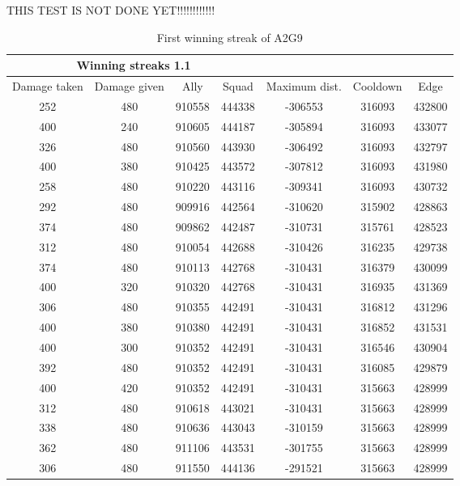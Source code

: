 
THIS TEST IS NOT DONE YET!!!!!!!!!!!!

\begin{centering}
\begin{table}

 \begin{tabular}{|c|c|c|c|c|c|c|}
	\multicolumn{4}{c}{Winning streaks 1.1} \\
	\hline
	Damage taken & Damage given & Ally & Squad & Maximum dist. & Cooldown & Edge \\
	\hline
	
	252&		480&			910558&	444338&	-306553&			316093&	432800\\
	400&		240&			910605&	444187&	-305894&			316093&	433077\\
	326&		480&			910560&	443930&	-306492&			316093&	432797\\
	400&		380&			910425&	443572&	-307812&			316093&	431980\\
	258&		480&			910220&	443116&	-309341&			316093&	430732\\
	292&		480&			909916&	442564&	-310620&			315902&	428863\\
	374&		480&			909862&	442487&	-310731&			315761&	428523\\
	312&		480&			910054&	442688&	-310426&			316235&	429738\\
	374&		480&			910113&	442768&	-310431&			316379&	430099\\
	400&		320&			910320&	442768&	-310431&			316935&	431369\\
	306&		480&			910355&	442491&	-310431&			316812&	431296\\
	400&		380&			910380&	442491&	-310431&			316852&	431531\\
	400&		300&			910352&	442491&	-310431&			316546&	430904\\
	392&		480&			910352&	442491&	-310431&			316085&	429879\\
	400&		420&			910352&	442491&	-310431&			315663&	428999\\
	312&		480&			910618&	443021&	-310431&			315663&	428999\\
	338&		480&			910636&	443043&	-310159&			315663&	428999\\
	362&		480&			911106&	443531&	-301755&			315663&	428999\\
	306&		480&			911550&	444136&	-291521&			315663&	428999\\
	\hline
\end{tabular}

	\label{winning_streak_1.1}
	\caption{First winning streak of A2G9}
\end{table}
\end{centering}
